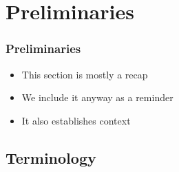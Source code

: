 \section{Preliminaries}
\frame{\tableofcontents[currentsection]}

\begin{frame}
  \frametitle{Preliminaries}
  \begin{itemize}
    \item This section is mostly a recap
    \item We include it anyway as a reminder
    \item It also establishes context
  \end{itemize}
\end{frame}

\subsection{Terminology}
\frame{\tableofcontents[currentsubsection]}

